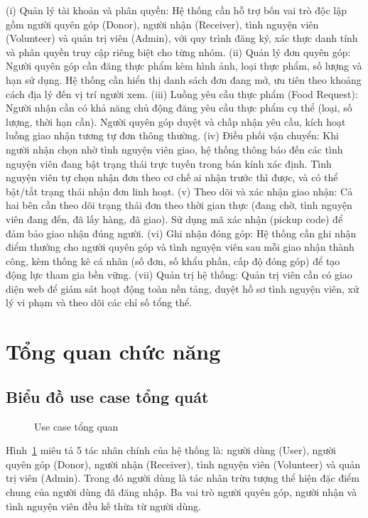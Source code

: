 \documentclass[../main.tex]{subfiles}%
\begin{document}
(i) Quản lý tài khoản và phân quyền: Hệ thống cần hỗ trợ bốn vai trò độc lập gồm người quyên góp (Donor), người nhận (Receiver), tình nguyện viên (Volunteer) và quản trị viên (Admin), với quy trình đăng ký, xác thực danh tính và phân quyền truy cập riêng biệt cho từng nhóm.
(ii) Quản lý đơn quyên góp: Người quyên góp cần đăng thực phẩm kèm hình ảnh, loại thực phẩm, số lượng và hạn sử dụng. Hệ thống cần hiển thị danh sách đơn đang mở, ưu tiên theo khoảng cách địa lý đến vị trí người xem. (iii) Luồng yêu cầu thực phẩm (Food Request): Người nhận cần có khả năng chủ động đăng yêu cầu thực phẩm cụ thể (loại, số lượng, thời hạn cần). Người quyên góp duyệt và chấp nhận yêu cầu, kích hoạt luồng giao nhận tương tự đơn thông thường. (iv) Điều phối vận chuyển: Khi người nhận chọn nhờ tình nguyện viên giao, hệ thống thông báo đến các tình nguyện viên đang bật trạng thái trực tuyến trong bán kính xác định. Tình nguyện viên tự chọn nhận đơn theo cơ chế ai nhận trước thì được, và có thể bật/tắt trạng thái nhận đơn linh hoạt. (v) Theo dõi và xác nhận giao nhận: Cả hai bên cần theo dõi trạng thái đơn theo thời gian thực (đang chờ, tình nguyện viên đang đến, đã lấy hàng, đã giao). Sử dụng mã xác nhận (pickup code) để đảm bảo giao nhận đúng người. (vi) Ghi nhận đóng góp: Hệ thống cần ghi nhận điểm thưởng cho người quyên góp và tình nguyện viên sau mỗi giao nhận thành công, kèm thống kê cá nhân (số đơn, số khẩu phần, cấp độ đóng góp) để tạo động lực tham gia bền vững. (vii) Quản trị hệ thống: Quản trị viên cần có giao diện web để giám sát hoạt động toàn nền tảng, duyệt hồ sơ tình nguyện viên, xử lý vi phạm và theo dõi các chỉ số tổng thể.

\section{Tổng quan chức năng}
\label{section:2.3}

\subsection{Biểu đồ use case tổng quát}
\label{subsection:2.3.1}

\begin{figure}[H]
    \centering
    \caption{Use case tổng quan}
    \label{fig:usecase_tong_quat}
\end{figure}

Hình~\ref{fig:usecase_tong_quat} miêu tả 5 tác nhân chính của hệ thống là: người dùng (User), người quyên góp (Donor), người nhận (Receiver), tình nguyện viên (Volunteer) và quản trị viên (Admin). Trong đó người dùng là tác nhân trừu tượng thể hiện đặc điểm chung của người dùng đã đăng nhập. Ba vai trò người quyên góp, người nhận và tình nguyện viên đều kế thừa từ người dùng.
\end{document}
